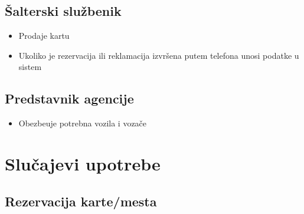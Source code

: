 \subsection{\v Salterski slu\v zbenik}
\begin{itemize}
	\item Prodaje kartu
	\item Ukoliko je rezervacija ili reklamacija izvr\v sena putem telefona unosi podatke u sistem
\end{itemize}
\subsection{Predstavnik agencije}
\begin{itemize}
	\item Obezbe\dj{}uje potrebna vozila i voza\v ce
\end{itemize}

\newpage
\section{Slu\v cajevi upotrebe}
\subsection{Rezervacija karte/mesta}
